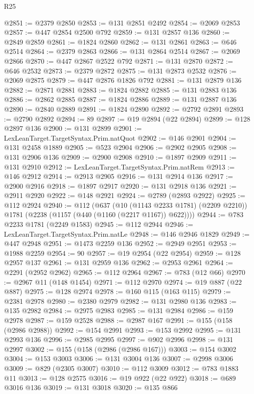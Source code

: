 \begin{lexlean}{R25}
\begin{coremodule}
{{{{{{{{{{{{{{{{{{{{{{{{{{{{{{{{{{{{{{{{{{{{{{{{{{{{{{{{{{{{{{{{{{{{{{{{{{{{{{{{{{{{{{{{{{{{{{{{{{{{{{{{{{{{{{{{{{{{{{{{{{{{{{{{{{{{{{{{{{{{{{{{{{{{{{{{{{{{{{{{{{{{{{{{{{{{{{{{{{{{{{{{{{{{{{{{{{{{{{{@2851 := @2379 @2850
@2853 := @131 @2851 @2492
@2854 := @2069 @2853
@2857 := @447 @2854 @2500 @792
@2859 := @131 @2857 @136
@2860 := @2849 @2859
@2861 := @1824 @2860
@2862 := @131 @2861
@2863 := @646 @2514
@2864 := @2379 @2863
@2866 := @131 @2864 @2514
@2867 := @2069 @2866
@2870 := @447 @2867 @2522 @792
@2871 := @131 @2870
@2872 := @646 @2532
@2873 := @2379 @2872
@2875 := @131 @2873 @2532
@2876 := @2069 @2875
@2879 := @447 @2876 @1826 @792
@2881 := @131 @2879 @136
@2882 := @2871 @2881
@2883 := @1824 @2882
@2885 := @131 @2883 @136
@2886 := @2862 @2885
@2887 := @1824 @2886
@2889 := @131 @2887 @136
@2890 := @2840 @2889
@2891 := @1824 @2890
@2892 := @2792 @2891
@2893 := @2790 @2892
@2894 := 89
@2897 := @19 @2894 (@22 @2894)
@2899 := @128 @2897 @136
@2900 := @131 @2899
@2901 := LexLeanTarget.TargetSyntax.Prim.natQuot
@2902 := @146 @2901
@2904 := @131 @2458 @1889
@2905 := @523 @2904
@2906 := @2902 @2905
@2908 := @131 @2906 @136
@2909 := @2900 @2908
@2910 := @1897 @2909
@2911 := @131 @2910
@2912 := LexLeanTarget.TargetSyntax.Prim.natRem
@2913 := @146 @2912
@2914 := @2913 @2905
@2916 := @131 @2914 @136
@2917 := @2900 @2916
@2918 := @1897 @2917
@2920 := @131 @2918 @136
@2921 := @2911 @2920
@2922 := @148 @2921
@2924 := @2789 (@2893 @2922)
@2925 := @112 @2924
@2940 := @112
    (@637
      (@10 (@1143 @2233 @1781) (@2209 @2210))
      @1781
      (@2238 (@1157 (@440 (@1160 (@2217 @1167)) @622))))
@2944 := @783 @2233 @1781 (@2249 @1583)
@2945 := @112 @2944
@2946 := LexLeanTarget.TargetSyntax.Prim.natLe
@2948 := @146 @2946 @1829
@2949 := @447 @2948
@2951 := @1473 @2259 @136
@2952 := @2949 @2951
@2953 := @1988 @2259
@2954 := 90
@2957 := @19 @2954 (@22 @2954)
@2959 := @128 @2957 @137
@2961 := @131 @2959 @136
@2962 := @2953 @2961
@2964 := @2291 (@2952 @2962)
@2965 := @112 @2964
@2967 := @783 (@12 @66)
@2970 := @2967 @11 (@148 @1454)
@2971 := @112 @2970
@2974 := @19 @887 (@22 @887)
@2975 := @128 @2974
@2978 := @160 @115 (@163 @115)
@2979 := @2381 @2978
@2980 := @2380 @2979
@2982 := @131 @2980 @136
@2983 := @135 @2982
@2984 := @2975 @2983
@2985 := @131 @2984
@2986 := @159 @2978
@2987 := @159 @2528
@2988 := @2987 @167
@2991 := @155 (@158 (@2986 @2988))
@2992 := @154 @2991
@2993 := @153 @2992
@2995 := @131 @2993 @136
@2996 := @2985 @2995
@2997 := @902 @2996
@2998 := @131 @2997
@3002 := @155 (@158 (@2986 (@2986 @167)))
@3003 := @154 @3002
@3004 := @153 @3003
@3006 := @131 @3004 @136
@3007 := @2998 @3006
@3009 := @829 (@2305 @3007)
@3010 := @112 @3009
@3012 := @783 @1883 @11
@3013 := @128 @2575
@3016 := @19 @922 (@22 @922)
@3018 := @689 @3016 @136
@3019 := @131 @3018
@3020 := @135 @866
}}}}}}}}}}}}}}}}}}}}}}}}}}}}}}}}}}}}}}}}}}}}}}}}}}}}}}}}}}}}}}}}}}}}}}}}}}}}}}}}}}}}}}}}}}}}}}}}}}}}}}}}}}}}}}}}}}}}}}}}}}}}}}}}}}}}}}}}}}}}}}}}}}}}}}}}}}}}}}}}}}}}}}}}}}}}}}}}}}}}}}}}}}}}}}}}}}}}}}}
\end{coremodule}
\end{lexlean}
